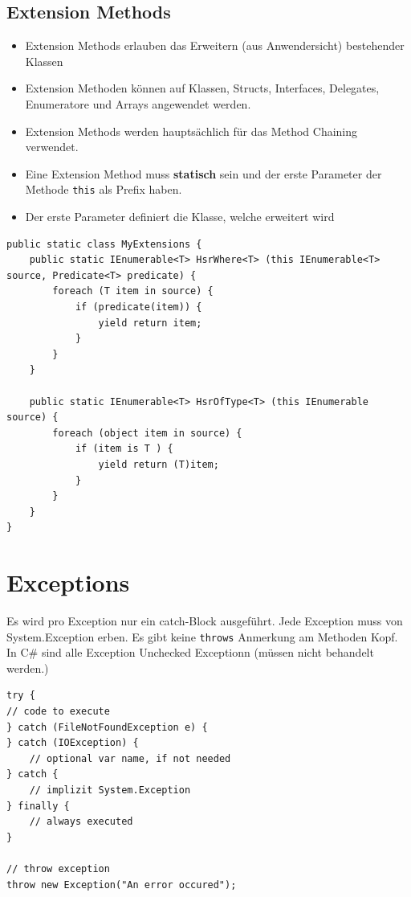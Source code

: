 \subsection{Extension Methods}
\begin{itemize}
	\item Extension Methods erlauben das Erweitern (aus Anwendersicht) bestehender Klassen
	\item Extension Methoden können auf Klassen, Structs, Interfaces, Delegates, Enumeratore und Arrays angewendet werden.
	\item Extension Methods werden hauptsächlich für das Method Chaining verwendet.
	\item Eine Extension Method muss \textbf{statisch} sein und der erste Parameter der Methode \lstinline|this| als Prefix haben. 
	\item Der erste Parameter definiert die Klasse, welche erweitert wird
\end{itemize}
\begin{lstlisting}
public static class MyExtensions {
	public static IEnumerable<T> HsrWhere<T> (this IEnumerable<T> source, Predicate<T> predicate) {
		foreach (T item in source) {
			if (predicate(item)) {
				yield return item;
			}
		}
	}
	
	public static IEnumerable<T> HsrOfType<T> (this IEnumerable source) {
		foreach (object item in source) {
			if (item is T ) {
				yield return (T)item;
			}
		}
	}
}
\end{lstlisting}

\section{Exceptions}
Es wird pro Exception nur ein catch-Block ausgeführt. Jede Exception muss von System.Exception erben. Es gibt keine \lstinline|throws| Anmerkung am Methoden Kopf. In C\# sind alle Exception Unchecked Exceptionn (müssen nicht behandelt werden.)
\begin{lstlisting}
try {
// code to execute
} catch (FileNotFoundException e) {
} catch (IOException) {
	// optional var name, if not needed
} catch {
	// implizit System.Exception
} finally {
	// always executed
}

// throw exception
throw new Exception("An error occured");
\end{lstlisting}


